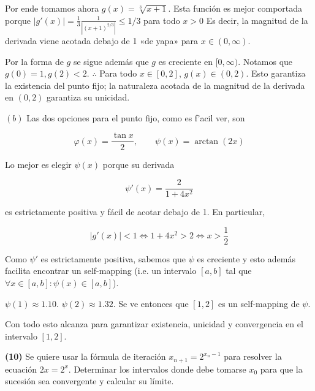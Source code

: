 \documentclass[12pt]{article}
\begin{document}
Por ende tomamos ahora $g(x) = \sqrt[3]{x+1} $. Esta función es mejor comportada
porque $\left| g'(x) \right| = \frac{1}{3} \frac{1}{\left| ( x+1 )^{2 / 3}
\right| } \leq 1 / 3$ para todo $x > 0$ Es decir, la magnitud de la derivada
viene acotada debajo de 1 «de yapa» para $x \in (0, \infty)$.

Por la forma de $g$ se sigue además que $g$ es creciente en $[0, \infty)$.
Notamos que $g(0) = 1, g(2) < 2$. $\therefore $ Para todo $x\in [0, 2]$, $g(x)
\in (0, 2)$. Esto garantiza la existencia del punto fijo; la naturaleza acotada
de la magnitud de la derivada en $(0, 2)$ garantiza su unicidad.

\pagebreak 

$(b)$ Las dos opciones para el punto fijo, como es f'acil ver, son 

\begin{equation*}
    \varphi(x) = \frac{\tan x}{2}, \qquad \psi(x) = \arctan(2x)
\end{equation*}

Lo mejor es elegir $\psi(x)$ porque su derivada

\begin{equation*}
    \psi'(x) = \frac{2}{1 + 4x^2}
\end{equation*}

es estrictamente positiva y fácil de acotar debajo de 1. En particular, 

\begin{equation*}
    \left| g'(x) \right| < 1 \iff 1 + 4x^2 > 2 \iff x > \frac{1}{2}
\end{equation*}

Como $\psi'$ es estrictamente positiva, sabemos que $\psi$ es creciente y esto
además facilita encontrar un self-mapping (i.e. un intervalo $[a, b]$ tal que
$\forall  x \in [a, b]: \psi(x) \in [a, b]$).

$\psi(1) \approx 1.10$. $\psi(2) \approx 1.32$. Se ve entonces que $[1, 2]$ es
un self-mapping de $\psi$.

Con todo esto alcanza para garantizar existencia, unicidad y convergencia en el
intervalo $[1, 2]$.

\pagebreak 

\begin{myframe}
    \textbf{(10)}  Se quiere usar la fórmula de iteración $x_{n+1} = 2^{x_n - 1}$
    para resolver la ecuación $2x = 2^x$. Determinar los intervalos donde debe
    tomarse $x_0$ para que la sucesión sea convergente y calcular su límite.
\end{myframe}
\end{document}
